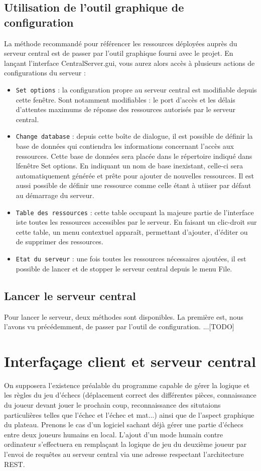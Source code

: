 \documentclass[a4paper,11pt]{report}
\begin{document}
\section{Utilisation de l'outil graphique de configuration}
		La méthode recommandé pour référencer les ressources déployées auprès du serveur central est de passer par l'outil graphique fourni avec le projet. En lançant l'interface CentralServer.gui, vous aurez alors accès à plusieurs actions de configurations du serveur :
\begin{itemize}
	\item {\tt Set options} : la configuration propre au serveur central est modifiable depuis cette fenêtre. Sont notamment modifiables : le port d'accès et les délais d'attentes maximums de réponse des ressources autorisés par le serveur central.
	\item {\tt Change database} : depuis cette boîte de dialogue, il est possible de définir la base de données qui contiendra les informations concernant l'accès aux ressources. Cette base de données sera placée dans le répertoire indiqué dans lfenêtre Set options. En indiquant un nom de base inexistant, celle-ci sera automatiquement générée et prête pour ajouter de nouvelles ressources. Il est aussi possible de définir une ressource comme celle étant à utiiser par défaut au démarrage du serveur.
   \item {\tt Table des ressources} : cette table occupant la majeure partie de l'interface iste toutes les ressources accessibles par le serveur. En faisant un clic-droit sur cette table, un menu contextuel apparaît, permettant d'ajouter, d'éditer ou de supprimer des ressources.
   \item {\tt Etat du serveur} : une fois toutes les ressources nécessaires ajoutées, il est possible de lancer et de stopper le serveur central depuis le menu File.
\end{itemize}
\section{Lancer le serveur central}
		Pour lancer le serveur, deux méthodes sont disponibles. La première est, nous l'avons vu précédemment, de passer par l'outil de configuration.
		...[TODO]

\chapter{Interfaçage client et serveur central}
        On supposera l'existence préalable du programme capable de gérer la logique et les règles du jeu d'échecs (déplacement correct des différentes pièces, connaissance du joueur devant jouer le prochain coup, reconnaissance des situtaions particulières telles que l'échec et l'échec et mat...) ainsi que de l'aspect graphique du plateau. Prenons le cas d'un logiciel sachant déjà gérer une partie d'échecs entre deux joueurs humains en local. L'ajout d'un mode humain contre ordinateur s'effectuera en remplaçant la logique de jeu du deuxième joueur par l'envoi de requêtes au serveur central via une adresse respectant l’architecture REST. 
\end{document}
